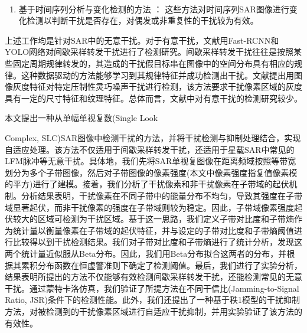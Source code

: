\documentclass[10.5pt,UTF8]{JR}
\theoremstyle{mystyle}
\newcommand{\upcite}[1]{\textsuperscript{\cite{#1}}}
\begin{document}
\begin{enumerate}
例如，Yu等人采用SSD网络检测多类别干扰\upcite{yuMulticlassRadioFrequency2018}。Fan等人将深度残差网络用于检测SAR原始数据中的干扰并将检测结果用于干扰抑制\upcite{fan2019interference}。Artiemjew等人使用LeNet型卷积神经网络在哨兵1号幅度图中检测干扰\upcite{artiemjewDeepLearningRFI2021a}。Tao等人使用U-Net网络在SAR原始数据中检测干扰\upcite{taoRadioFrequencyInterference2021}。Lu等人使用孪生神经网络检测SAR幅度图像中的干扰。Chojka等人使用像素卷积、阈值化等模块组成的特征提取神经网络进行干扰检测\upcite{s20102919}。尽管基于深度学习的方法在SAR干扰检测方面显示出潜力，但神经网络的训练需要大量的标注数据。
  \item %
基于时间序列分析与变化检测的方法 \upcite{Dan2018,liSimultaneousScreeningDetection2022,taoExtractionMitigationRadio2022a}：
这些方法对时间序列SAR图像进行变化检测以判断干扰是否存在，对偶发或非重复性的干扰较为有效。
\end{enumerate}

上述工作均是针对SAR中的无意干扰。对于有意干扰，文献\cite{tau2024jy}用Fast-RCNN和YOLO网络对间歇采样转发干扰进行了检测研究。间歇采样转发干扰往往是按照某些固定周期规律转发的，其造成的干扰假目标串在图像中的空间分布具有相应的规律。这种数据驱动的方法能够学习到其规律特征并成功检测出干扰。文献\cite{zhang2024dj}提出用图像灰度特征对特定压制性灵巧噪声干扰进行检测，该方法要求干扰像素区域的灰度具有一定的尺寸特征和纹理特征。总体而言，文献中对有意干扰的检测研究较少。

本文提出一种从单幅单视复数(Single Look\par\noindent Complex, SLC)SAR图像中检测干扰的方法，并将干扰检测与抑制处理结合，实现自适应处理。该方法不仅适用于间歇采样转发干扰，还适用于星载SAR中常见的LFM脉冲等无意干扰。具体地，我们先将SAR单视复图像在距离频域按照等带宽划分为多个子带图像，然后对子带图像的像素强度(本文中像素强度指复值像素模的平方)进行了建模。接着，我们分析了干扰像素和非干扰像素在子带域的起伏机制。分析结果表明，干扰像素在不同子带中的能量分布不均匀，导致其强度在子带域显著起伏，而非干扰像素的强度在子带域则较为稳定。因此，子带域像素强度起伏较大的区域可检测为干扰区域。基于这一思路，我们定义子带对比度和子带熵作为统计量以衡量像素在子带域的起伏特征，并与设定的子带对比度和子带熵阈值进行比较得以到干扰检测结果。我们对子带对比度和子带熵进行了统计分析，发现这两个统计量近似服从Beta分布。因此，我们用Beta分布拟合这两者的分布，并根据其累积分布函数在恒虚警准则下确定了检测阈值。最后，我们进行了实验分析，结果表明所提出的方法不仅能够有效检测间歇采样转发干扰，还能检测常见的无意干扰。通过蒙特卡洛仿真，我们验证了所提方法在不同干信比(Jamming-to-Signal Ratio, JSR)条件下的检测性能。此外，我们还提出了一种基于秩1模型的干扰抑制方法，对被检测到的干扰像素区域进行自适应干扰抑制，并用实验验证了该方法的有效性。
\end{document}

